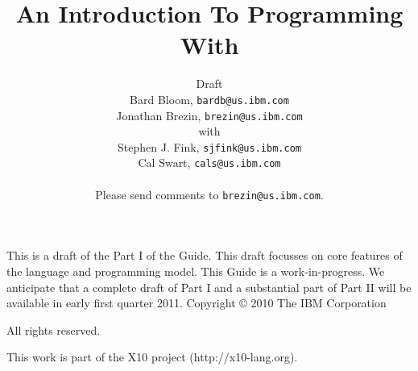 
\thispagestyle{empty}

\title{An Introduction To Programming With \Xten}
\author{
{\sc Draft}  \\
      Bard Bloom, {\tt bardb@us.ibm.com}\\
      Jonathan Brezin, {\tt brezin@us.ibm.com} \\
   with\\ 
      Stephen J. Fink, {\tt sjfink@us.ibm.com} \\  
      Cal Swart, {\tt cals@us.ibm.com}\\  
   \\
   Please send comments to {\tt brezin@us.ibm.com}.
}
\maketitle

This is a draft of the Part I of the Guide. This draft focusses on core features of the 
\Xten{} language and programming model.  This Guide is a work-in-progress.  We anticipate that
a complete draft of Part I and a substantial part of Part II will be available
in early first quarter 2011.
\newpage
\vspace*{5in}
Copyright \copyright{} 2010 The IBM Corporation

All rights reserved.

This work is part of the X10 project (http://x10-lang.org).
